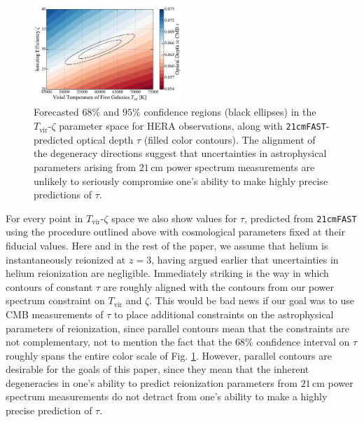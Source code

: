 \documentclass[twocolumn,aps,prd,nofootinbib,showpacs]{revtex4-1}
\begin{document}
\begin{figure}[!]
	\centering
	\includegraphics[width=0.5\textwidth]{figures/21cmDegen_wTau.pdf}
	\caption{Forecasted $68\%$ and $95\%$ confidence regions (black ellipses) in the $T_\textrm{vir}$-$\zeta$ parameter space for HERA observations, along with {\tt 21cmFAST}-predicted optical depth $\tau$ (filled color contours). The alignment of the degeneracy directions suggest that uncertainties in astrophysical parameters arising from $21\,\textrm{cm}$ power spectrum measurements are unlikely to seriously compromise one's ability to make highly precise predictions of $\tau$.}
	\label{fig:21cmDegen_wTau}
\end{figure}

For every point in $T_\textrm{vir}$-$\zeta$ space we also show values for $\tau$, predicted from {\tt 21cmFAST} using the procedure outlined above with cosmological parameters fixed at their fiducial values. Here and in the rest of the paper, we assume that helium is instantaneously reionized at $z = 3$, having argued earlier that uncertainties in helium reionization are negligible. Immediately striking is the way in which contours of constant $\tau$ are roughly aligned with the contours from our power spectrum constraint on $T_\textrm{vir}$ and $\zeta$. This would be bad news if our goal was to use CMB measurements of $\tau$ to place additional constraints on the astrophysical parameters of reionization, since parallel contours mean that the constraints are not complementary, not to mention the fact that the $68\%$ confidence interval on $\tau$ roughly spans the entire color scale of Fig. \ref{fig:21cmDegen_wTau}. However, parallel contours are desirable for the goals of this paper, since they mean that the inherent degeneracies in one's ability to predict reionization parameters from $21\,\textrm{cm}$ power spectrum measurements do not detract from one's ability to make a highly precise prediction of $\tau$.
\end{document}
